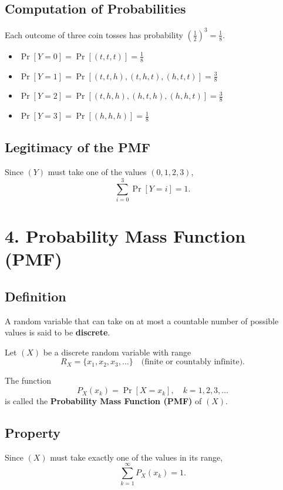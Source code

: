 \documentclass[11pt]{article}
\begin{document}
\subsection*{Computation of Probabilities}

Each outcome of three coin tosses has probability $\left(\frac{1}{2}\right)^3 = \frac{1}{8}$.

\begin{itemize}
\item $\Pr[Y = 0] = \Pr[(t,t,t)] = \frac{1}{8}$
\item $\Pr[Y = 1] = \Pr[(t,t,h),(t,h,t),(h,t,t)] = \frac{3}{8}$
\item $\Pr[Y = 2] = \Pr[(t,h,h),(h,t,h),(h,h,t)] = \frac{3}{8}$
\item $\Pr[Y = 3] = \Pr[(h,h,h)] = \frac{1}{8}$
\end{itemize}

\subsection*{Legitimacy of the PMF}

Since $(Y)$ must take one of the values $(0,1,2,3)$,
\[
\sum_{i=0}^{3} \Pr[Y=i] = 1.
\]

\section*{4. Probability Mass Function (PMF)}

\subsection*{Definition}

A random variable that can take on at most a countable number of possible values is said to be \textbf{discrete}.

Let $(X)$ be a discrete random variable with range
\[
R_X = \{x_1, x_2, x_3, \dots\} \quad \text{(finite or countably infinite)}.
\]

The function
\[
P_X(x_k) = \Pr[X = x_k], \quad k = 1,2,3,\dots
\]
is called the \textbf{Probability Mass Function (PMF)} of $(X)$.

\subsection*{Property}

Since $(X)$ must take exactly one of the values in its range,
\[
\sum_{k=1}^{\infty} P_X(x_k) = 1.
\]
\end{document}
